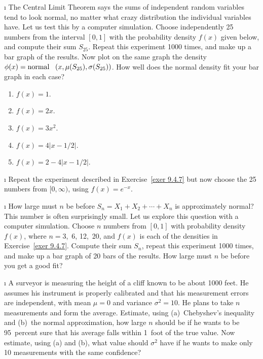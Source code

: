 \begin{LJSItem}
\i\label{exer 9.4.7} The Central Limit Theorem says the sums of independent
random variables tend to look normal, no matter what crazy distribution the
individual variables have.  Let us test this by a computer simulation.  Choose
independently 25 numbers from the interval $[0,1]$ with the probability
density $f(x)$ given below, and compute their sum $S_{25}$.  Repeat this
experiment 1000 times, and make up a bar graph of the results.  Now plot on the
same graph the density $\phi(x) = \mbox {normal \,\,\,}(x,\mu(S_{25}),\sigma(S_{25}))$. 
How well does the normal density fit your bar graph in each case?
\begin{enumerate}
\item  $f(x) = 1$.

\item  $f(x) = 2x$.

\item  $f(x) = 3x^2$.

\item  $f(x) = 4|x - 1/2|$.

\item  $f(x) = 2 - 4|x - 1/2|$.
\end{enumerate}

\i\label{exer 9.4.8}  Repeat the experiment described in Exercise~\ref{exer 9.4.7} but now
choose the 25 numbers from $[0,\infty)$, using $f(x) = e^{-x}$.

\i\label{exer 9.4.9}  How large must $n$ be before $S_n = X_1 + X_2 +\cdots+ X_n$ is
approximately normal?  This number is often surprisingly small.  Let us explore
this question with a computer simulation.  Choose $n$ numbers from $[0,1]$
with probability density $f(x)$, where $n = 3$,~6, 12,~20, and $f(x)$ is each
of the densities in Exercise~\ref{exer 9.4.7}.  Compute their sum $S_n$,
repeat this experiment 1000 times, and make up a bar graph of 20 bars of the
results.  How large must $n$ be before you get a good fit?

\i\label{exer 9.4.10}  A surveyor is measuring the height of a cliff known to be about 1000
feet.  He assumes his instrument is properly calibrated and that his measurement
errors are independent, with mean $\mu = 0$ and variance $\sigma^2 = 10$.  He
plans to take $n$ measurements and form the average.  Estimate, using
(a)~Chebyshev's inequality and (b)~the normal approximation, how large $n$
should be if he wants to be 95~percent sure that his average falls within
1~foot of the true value.  Now estimate, using (a) and (b), what value should
$\sigma^2$ have if he wants to make only 10 measurements with the same
confidence?


\end{LJSItem}
